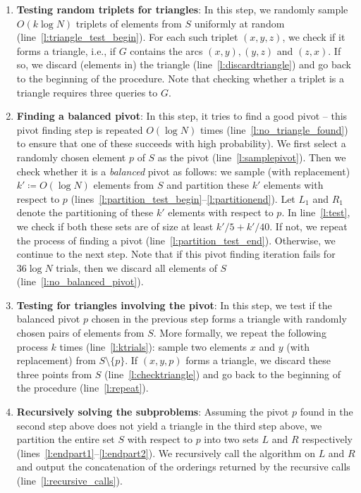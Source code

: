 \documentclass[11pt]{llncs}
\begin{document}
\begin{enumerate}

\item {\bf Testing random triplets for triangles}: In this step, we randomly sample $O( k\log N)$ triplets of elements  from $S$ uniformly at random (line~\ref{l:triangle_test_begin}). For each such triplet $(x,y,z)$, we check if it forms a triangle, i.e., if $G$ contains the arcs $(x,y),(y,z)$ and $(z,x)$. If so, we discard (elements in) the triangle (line~\ref{l:discardtriangle}) and go back to the beginning of the procedure. Note that checking whether a triplet is a triangle requires three queries to $G$.  
    
\item {\bf Finding a balanced pivot}: In this step, it tries to find a good pivot -- this pivot finding step is repeated $O(\log N)$ times (line~\ref{l:no_triangle_found}) to ensure that one of these succeeds with high probability). We first select a randomly chosen element $p$ of $S$ as the pivot (line~\ref{l:samplepivot}). Then we check whether it is a {\em balanced} pivot as follows: we sample (with replacement) $k' \coloneqq O(\log N)$ elements from $S$ and partition these $k'$ elements with respect to $p$ (lines~\ref{l:partition_test_begin}--\ref{l:partitionend}). Let $L_1$ and $R_1$ denote the partitioning of these $k'$ elements with respect to $p$. In line~\ref{l:test}, we check if both these sets are of size at least $k'/5 + k'/40$. If not, we repeat the process of finding a pivot (line~\ref{l:partition_test_end}). Otherwise, we continue to the next step.  Note that if this pivot finding iteration fails for $36 \log N$ trials, then we discard all elements of $S$ (line~\ref{l:no_balanced_pivot}).

\item {\bf Testing for triangles involving the pivot}: In this step, we test if the balanced pivot $p$ chosen in the previous step forms a triangle with randomly chosen pairs of elements from $S$. More formally, we repeat the following process $k$ times (line~\ref{l:ktrials}): sample two elements $x$ and $y$ (with replacement) from $S \setminus \{p\}$. If $(x,y,p)$ forms a triangle, we discard these three points from $S$ (line~\ref{l:checktriangle}) and go back to the beginning of the procedure (line~\ref{l:repeat}). 

\item {\bf Recursively solving the subproblems}: Assuming the pivot $p$ found in the second step above does not yield a triangle in the third step above, we partition the entire set $S$ with respect to $p$ into two sets $L$ and $R$ respectively (lines~\ref{l:endpart1}--\ref{l:endpart2}). We recursively call the algorithm on $L$ and $R$ and output the concatenation of the orderings returned by the recursive calls (line~\ref{l:recursive_calls}). 
\end{enumerate}
\end{document}
